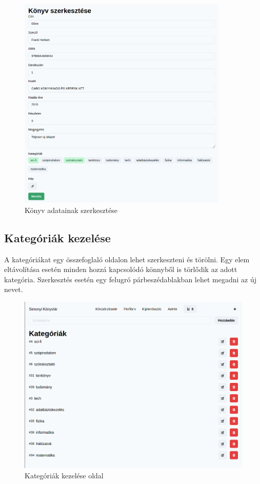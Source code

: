 \begin{figure}[!ht]
  \centering
  \includegraphics[width=100mm, keepaspectratio]{figures/book-edit.png}
  \caption{Könyv adatainak szerkesztése}
  \label{fig:BookEdit}
\end{figure}

\subsection{Kategóriák kezelése}

A kategóriákat egy összefoglaló oldalon lehet szerkeszteni és törölni. Egy elem eltávolítása esetén
minden hozzá kapcsolódó könnyből is törlődik az adott kategória. Szerkesztés esetén egy felugró párbeszédablakban lehet
megadni az új nevet.

\begin{figure}[!ht]
  \centering
  \includegraphics[width=150mm, keepaspectratio]{figures/category-admin-list.png}
  \caption{Kategóriák kezelése oldal}
  \label{fig:CategoryAdmin}
\end{figure}

